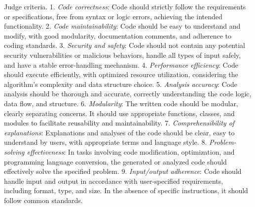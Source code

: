 Judge criteria.   
1. \emph{Code correctness}: Code should strictly follow the requirements or specifications, free from syntax or logic errors, achieving the intended functionality.
2. \emph{Code maintainability}: Code should be easy to understand and modify, with good modularity, documentation comments, and adherence to coding standards.
3. \emph{Security and safety}: Code should not contain any potential security vulnerabilities or malicious behaviors, handle all types of input safely, and have a stable error-handling mechanism.
4. \emph{Performance efficiency}: Code should execute efficiently, with optimized resource utilization, considering the algorithm's complexity and data structure choice.
5. \emph{Analysis accuracy}: Code analysis should be thorough and accurate, correctly understanding the code logic, data flow, and structure.
6. \emph{Modularity}: The written code should be modular, clearly separating concerns. It should use appropriate functions, classes, and modules to facilitate reusability and maintainability.
7. \emph{Comprehensibility of explanations}: Explanations and analyses of the code should be clear, easy to understand by users, with appropriate terms and language style.
8. \emph{Problem-solving effectiveness}: In tasks involving code modification, optimization, and programming language conversion, the generated or analyzed code should effectively solve the specified problem.
9. \emph{Input/output adherence}: Code should handle input and output in accordance with user-specified requirements, including format, type, and size. In the absence of specific instructions, it should follow common standards.

